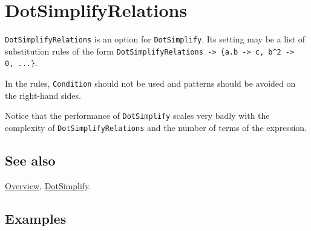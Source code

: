 \documentclass[../FeynCalcManual.tex]{subfiles}
\begin{document}
\hypertarget{dotsimplifyrelations}{%
\section{DotSimplifyRelations}\label{dotsimplifyrelations}}

\texttt{DotSimplifyRelations} is an option for \texttt{DotSimplify}. Its
setting may be a list of substitution rules of the form
\texttt{DotSimplifyRelations -> \{\allowbreak{}a.b -> c,\ \allowbreak{}b^2 -> 0,\ \allowbreak{}...\}}.

In the rules, \texttt{Condition} should not be used and patterns should
be avoided on the right-hand sides.

Notice that the performance of \texttt{DotSimplify} scales very badly
with the complexity of \texttt{DotSimplifyRelations} and the number of
terms of the expression.

\subsection{See also}

\hyperlink{toc}{Overview}, \hyperlink{dotsimplify}{DotSimplify}.

\subsection{Examples}
\end{document}
